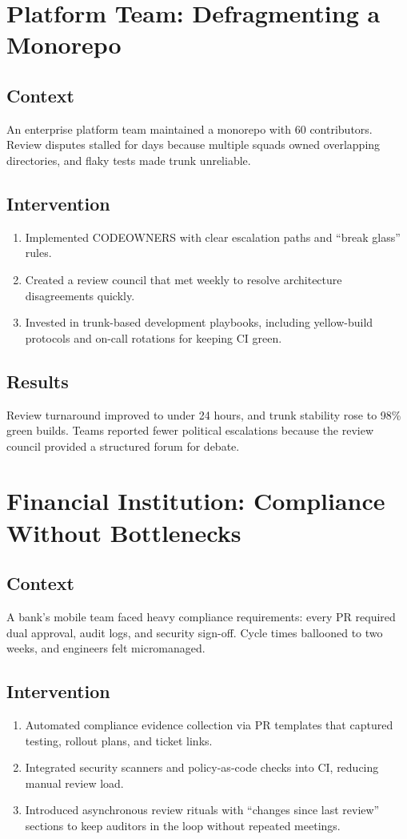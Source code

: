 \section{Platform Team: Defragmenting a Monorepo}
\subsection{Context}
An enterprise platform team maintained a monorepo with 60 contributors. Review disputes stalled for days because multiple squads owned overlapping directories, and flaky tests made trunk unreliable.

\subsection{Intervention}
\begin{enumerate}
  \item Implemented CODEOWNERS with clear escalation paths and ``break glass'' rules.
  \item Created a review council that met weekly to resolve architecture disagreements quickly.
  \item Invested in trunk-based development playbooks, including yellow-build protocols and on-call rotations for keeping CI green.
\end{enumerate}

\subsection{Results}
Review turnaround improved to under 24 hours, and trunk stability rose to 98\% green builds. Teams reported fewer political escalations because the review council provided a structured forum for debate.

\section{Financial Institution: Compliance Without Bottlenecks}
\subsection{Context}
A bank's mobile team faced heavy compliance requirements: every PR required dual approval, audit logs, and security sign-off. Cycle times ballooned to two weeks, and engineers felt micromanaged.

\subsection{Intervention}
\begin{enumerate}
  \item Automated compliance evidence collection via PR templates that captured testing, rollout plans, and ticket links.
  \item Integrated security scanners and policy-as-code checks into CI, reducing manual review load.
  \item Introduced asynchronous review rituals with ``changes since last review'' sections to keep auditors in the loop without repeated meetings.
\end{enumerate}

